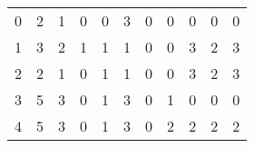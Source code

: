 \begin{tabular}{lllrrlrrrrr}
\toprule
0 &  2 &  1 &  0 &  0 &  3 &  0 &  0 &  0 &  0 &  0 \\
1 &  3 &  2 &  1 &  1 &  1 &  0 &  0 &  3 &  2 &  3 \\
2 &  2 &  1 &  0 &  1 &  1 &  0 &  0 &  3 &  2 &  3 \\
3 &  5 &  3 &  0 &  1 &  3 &  0 &  1 &  0 &  0 &  0 \\
4 &  5 &  3 &  0 &  1 &  3 &  0 &  2 &  2 &  2 &  2 \\
\bottomrule
\end{tabular}

